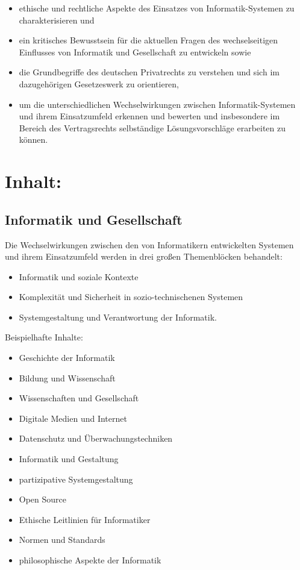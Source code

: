 \begin{itemize}
\item
  ethische und rechtliche Aspekte des Einsatzes von Informatik-Systemen
  zu charakterisieren und
\item
  ein kritisches Bewusstsein für die aktuellen Fragen des
  wechselseitigen Einflusses von Informatik und Gesellschaft zu
  entwickeln sowie
\item
  die Grundbegriffe des deutschen Privatrechts zu verstehen und sich im
  dazugehörigen Gesetzeswerk zu orientieren,
\item
  um die unterschiedlichen Wechselwirkungen zwischen Informatik-Systemen
  und ihrem Einsatzumfeld erkennen und bewerten und insbesondere im
  Bereich des Vertragsrechts selbständige Lösungsvorschläge erarbeiten
  zu können.
\end{itemize}

\section*{Inhalt:}\label{inhalt-16}

\subsection*{Informatik und
Gesellschaft}\label{informatik-und-gesellschaft}

Die Wechselwirkungen zwischen den von Informatikern entwickelten
Systemen und ihrem Einsatzumfeld werden in drei großen Themenblöcken
behandelt:

\begin{itemize}
\item
  Informatik und soziale Kontexte
\item
  Komplexität und Sicherheit in sozio-technischenen Systemen
\item
  Systemgestaltung und Verantwortung der Informatik.
\end{itemize}

Beispielhafte Inhalte:

\begin{itemize}
\item
  Geschichte der Informatik
\item
  Bildung und Wissenschaft
\item
  Wissenschaften und Gesellschaft
\item
  Digitale Medien und Internet
\item
  Datenschutz und Überwachungstechniken
\item
  Informatik und Gestaltung
\item
  partizipative Systemgestaltung
\item
  Open Source
\item
  Ethische Leitlinien für Informatiker
\item
  Normen und Standards
\item
  philosophische Aspekte der Informatik
\end{itemize}

